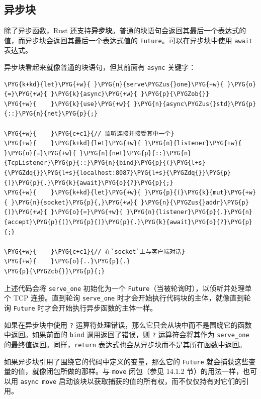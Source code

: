\subsection{异步块}

除了异步函数，Rust 还支持\textbf{异步块}。普通的块语句会返回其最后一个表达式的值，而异步块会返回其最后一个表达式值的 \texttt{Future}。可以在异步块中使用 \texttt{await} 表达式。

异步块看起来就像普通的块语句，但其前面有 \texttt{async} 关键字：

\begin{Verbatim}[commandchars=\\\{\},breaklines=true,breakanywhere=true,fontsize=\codefont,xleftmargin=17bp]
\PYG{k+kd}{let}\PYG{+w}{ }\PYG{n}{serve\PYGZus{}one}\PYG{+w}{ }\PYG{o}{=}\PYG{+w}{ }\PYG{k}{async}\PYG{+w}{ }\PYG{p}{\PYGZob{}}
\PYG{+w}{    }\PYG{k}{use}\PYG{+w}{ }\PYG{n}{async\PYGZus{}std}\PYG{p}{::}\PYG{n}{net}\PYG{p}{;}

\PYG{+w}{    }\PYG{c+c1}{// 监听连接并接受其中一个}
\PYG{+w}{    }\PYG{k+kd}{let}\PYG{+w}{ }\PYG{n}{listener}\PYG{+w}{ }\PYG{o}{=}\PYG{+w}{ }\PYG{n}{net}\PYG{p}{::}\PYG{n}{TcpListener}\PYG{p}{::}\PYG{n}{bind}\PYG{p}{(}\PYG{l+s}{\PYGZdq{}}\PYG{l+s}{localhost:8087}\PYG{l+s}{\PYGZdq{}}\PYG{p}{)}\PYG{p}{.}\PYG{k}{await}\PYG{o}{?}\PYG{p}{;}
\PYG{+w}{    }\PYG{k+kd}{let}\PYG{+w}{ }\PYG{p}{(}\PYG{k}{mut}\PYG{+w}{ }\PYG{n}{socket}\PYG{p}{,}\PYG{+w}{ }\PYG{n}{\PYGZus{}addr}\PYG{p}{)}\PYG{+w}{ }\PYG{o}{=}\PYG{+w}{ }\PYG{n}{listener}\PYG{p}{.}\PYG{n}{accept}\PYG{p}{(}\PYG{p}{)}\PYG{p}{.}\PYG{k}{await}\PYG{o}{?}\PYG{p}{;}

\PYG{+w}{    }\PYG{c+c1}{// 在`socket`上与客户端对话}
\PYG{+w}{    }\PYG{o}{..}\PYG{p}{.}
\PYG{p}{\PYGZcb{}}\PYG{p}{;}
\end{Verbatim}

上述代码会将 \texttt{serve\_one} 初始化为一个 \texttt{Future}（当被轮询时），以侦听并处理单个 TCP 连接。直到轮询 \texttt{serve\_one} 时才会开始执行代码块的主体，就像直到轮询 \texttt{Future} 时才会开始执行异步函数的主体一样。

如果在异步块中使用 \texttt{?} 运算符处理错误，那么它只会从块中而不是围绕它的函数中返回。如果前面的 \texttt{bind} 调用返回了错误，则 \texttt{?} 运算符会将其作为 \texttt{serve\_one} 的最终值返回。同样，\texttt{return} 表达式也会从异步块而不是其所在函数中返回。

如果异步块引用了围绕它的代码中定义的变量，那么它的 \texttt{Future} 就会捕获这些变量的值，就像闭包所做的那样。与 \texttt{move} 闭包（参见 14.1.2 节）的用法一样，也可以用 \texttt{async move} 启动该块以获取捕获的值的所有权，而不仅仅持有对它们的引用。

